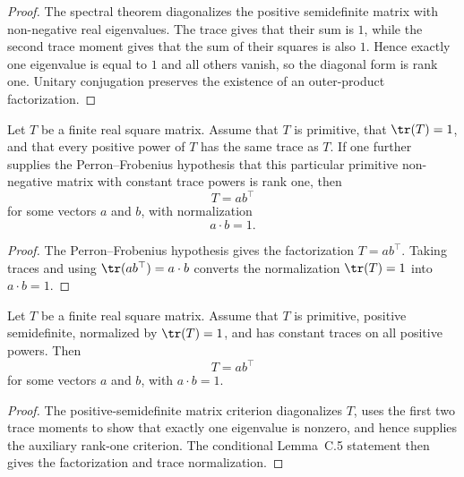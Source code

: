 \begin{proof}
    \leanok
    The spectral theorem diagonalizes the positive semidefinite matrix with
    non-negative real eigenvalues. The trace gives that their sum is $1$, while
    the second trace moment gives that the sum of their squares is also $1$.
    Hence exactly one eigenvalue is equal to $1$ and all others vanish, so the
    diagonal form is rank one. Unitary conjugation preserves the existence of an
    outer-product factorization.
\end{proof}

\begin{theorem}
    \label{thm:sal_zcl_implies_rank_one_t}
    \leanok
    Let $T$ be a finite real square matrix. Assume that $T$ is primitive,
    that $\tr(T) = 1$, and that every positive power of $T$ has the same trace
    as $T$. If one further supplies the Perron--Frobenius hypothesis that
    this particular primitive non-negative matrix with constant trace powers is
    rank one, then
    \[
        T = a b^\top
    \]
    for some vectors $a$ and $b$, with normalization
    \[
        a \cdot b = 1.
    \]
\end{theorem}

\begin{proof}
    \leanok
    The Perron--Frobenius hypothesis gives the factorization $T = a b^\top$.
    Taking traces and using $\tr(a b^\top) = a \cdot b$ converts the
    normalization $\tr(T) = 1$ into $a \cdot b = 1$.
\end{proof}

\begin{theorem}
    \label{thm:psd_trace_powers_rank_one_t}
    \leanok
    Let $T$ be a finite real square matrix. Assume that $T$ is primitive,
    positive semidefinite, normalized by $\tr(T)=1$, and has constant traces on
    all positive powers. Then
    \[
        T = a b^\top
    \]
    for some vectors $a$ and $b$, with $a \cdot b = 1$.
\end{theorem}

\begin{proof}
    \leanok
    The positive-semidefinite matrix criterion diagonalizes $T$, uses the first
    two trace moments to show that exactly one eigenvalue is nonzero, and hence
    supplies the auxiliary rank-one criterion. The conditional Lemma~C.5
    statement then gives the factorization and trace normalization.
\end{proof}

